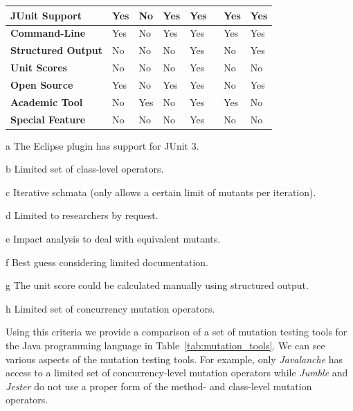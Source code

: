 \begin{table}
\begin{threeparttable}
\begin{tabular}{|l|l|l|l|l|l|l|}
      \hline \cellcolor[RGB]{169,196,223} \textbf{JUnit Support} & Yes & No\tnote{c} & Yes & Yes & Yes & Yes \\
      \hline \cellcolor[RGB]{169,196,223} \textbf{Command-Line} & Yes & No & Yes & Yes & Yes & Yes \\
      \hline \cellcolor[RGB]{169,196,223} \textbf{Structured Output} & No & No & No & Yes & No & Yes \\
      \hline \cellcolor[RGB]{169,196,223} \textbf{Unit Scores} & No & No & No & Yes & No & No\tnote{g} \\
      \hline \cellcolor[RGB]{169,196,223} \textbf{Open Source} & Yes & No\tnote{d} & Yes & Yes & No & Yes \\
      \hline \cellcolor[RGB]{169,196,223} \textbf{Academic Tool} & No & Yes & No & Yes & Yes & No \\
      \hline \cellcolor[RGB]{169,196,223} \textbf{Special Feature} & No & No & No & Yes~\tnote{e}~\tnote{h} & No & No \\
      \hline
    \end{tabular}
    \begin{tablenotes}
      \item[a] The Eclipse plugin has support for JUnit 3.
      \item[b] Limited set of class-level operators.
      \item[c] Iterative schmata (only allows a certain limit of mutants per iteration).
      \item[d] Limited to researchers by request.
      \item[e] Impact analysis to deal with equivalent mutants.
      \item[f] Best guess considering limited documentation.
      \item[g] The unit score could be calculated manually using structured output.
      \item[h] Limited set of concurrency mutation operators.
    \end{tablenotes}
  \end{threeparttable}
\end{table}
\afterpage\clearpage

Using this criteria we provide a comparison of a set of mutation testing tools for the Java programming language in Table~\ref{tab:mutation_tools}. We can see various aspects of the mutation testing tools. For example, only \emph{Javalanche} has access to a limited set of concurrency-level mutation operators while \emph{Jumble} and \emph{Jester} do not use a proper form of the method- and class-level mutation operators.


